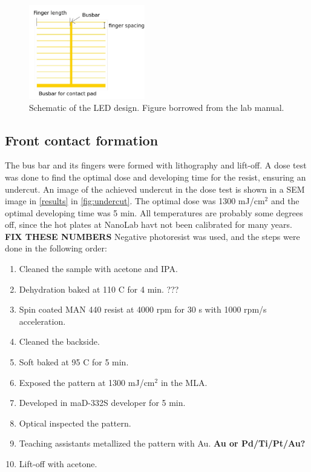 \begin{figure}[ht]
    \centering
    \includegraphics[width=0.45\textwidth]{figures/LED_schematic.jpg}
    \caption{
        Schematic of the LED design.
        Figure borrowed from the lab manual.
    }
    \label{fig:led_schematic}
\end{figure}


\subsection{Front contact formation}
\label{methods:front_contact}

The bus bar and its fingers were formed with lithography and lift-off.
A dose test was done to find the optimal dose and developing time for the resist, ensuring an undercut.
An image of the achieved undercut in the dose test is shown in a SEM image in \autoref{results} in \autoref{fig:undercut}.
The optimal dose was 1300 mJ/cm$^2$ and the optimal developing time was 5 min.
All temperatures are probably some degrees off, since the hot plates at NanoLab havt not been calibrated for many years.
\textbf{FIX THESE NUMBERS}
Negative photoresist was used, and the steps were done in the following order:
\begin{enumerate}
    \item Cleaned the sample with acetone and IPA.
    \item Dehydration baked at 110 \textdegree C for 4 min. ???
    \item Spin coated MAN 440 resist at 4000 rpm for 30 s with 1000 rpm/s acceleration.
    \item Cleaned the backside.
    \item Soft baked at 95 \textdegree C for 5 min.
    \item Exposed the pattern at 1300 mJ/cm$^2$ in the MLA.
    \item Developed in maD-332S developer for 5 min.
    \item Optical inspected the pattern.
    \item Teaching assistants metallized the pattern with Au. \textbf{Au or Pd/Ti/Pt/Au?}
    \item Lift-off with acetone.
\end{enumerate}

